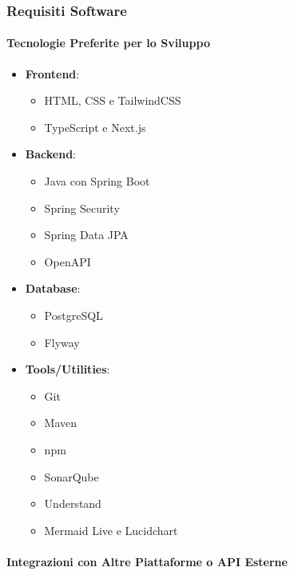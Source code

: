 \subsubsection{Requisiti Software}

\paragraph{Tecnologie Preferite per lo Sviluppo}

\begin{itemize}
    \item \textbf{Frontend}:
    \begin{itemize}
        \item HTML, CSS e TailwindCSS
        \item TypeScript e Next.js
    \end{itemize}
    
    \item \textbf{Backend}:
    \begin{itemize}
        \item Java con Spring Boot
        \item Spring Security
        \item Spring Data JPA
        \item OpenAPI
    \end{itemize}
    
    \item \textbf{Database}:
    \begin{itemize}
        \item PostgreSQL
        \item Flyway
    \end{itemize}
    
    \item \textbf{Tools/Utilities}:
    \begin{itemize}
        \item Git
        \item Maven
        \item npm
        \item SonarQube
        \item Understand
        \item Mermaid Live e Lucidchart
    \end{itemize}
\end{itemize}

\paragraph{Integrazioni con Altre Piattaforme o API Esterne}

